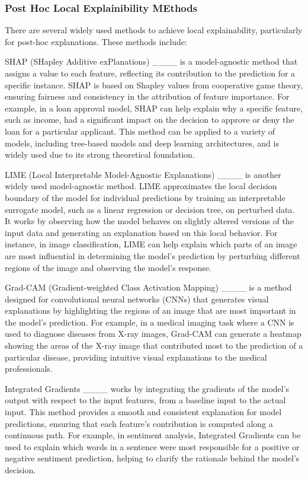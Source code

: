 \subsubsection{Post Hoc Local Explainibility MEthods}
There are several widely used methods to achieve local explainability, particularly for post-hoc explanations. These methods include:

SHAP (SHapley Additive exPlanations) ____ is a model-agnostic method that assigns a value to each feature, reflecting its contribution to the prediction for a specific instance. SHAP is based on Shapley values from cooperative game theory, ensuring fairness and consistency in the attribution of feature importance. For example, in a loan approval model, SHAP can help explain why a specific feature, such as income, had a significant impact on the decision to approve or deny the loan for a particular applicant. This method can be applied to a variety of models, including tree-based models and deep learning architectures, and is widely used due to its strong theoretical foundation.

LIME (Local Interpretable Model-Agnostic Explanations) ____ is another widely used model-agnostic method. LIME approximates the local decision boundary of the model for individual predictions by training an interpretable surrogate model, such as a linear regression or decision tree, on perturbed data. It works by observing how the model behaves on slightly altered versions of the input data and generating an explanation based on this local behavior. For instance, in image classification, LIME can help explain which parts of an image are most influential in determining the model's prediction by perturbing different regions of the image and observing the model's response.

Grad-CAM (Gradient-weighted Class Activation Mapping) ____ is a method designed for convolutional neural networks (CNNs) that generates visual explanations by highlighting the regions of an image that are most important in the model's prediction. For example, in a medical imaging task where a CNN is used to diagnose diseases from X-ray images, Grad-CAM can generate a heatmap showing the areas of the X-ray image that contributed most to the prediction of a particular disease, providing intuitive visual explanations to the medical professionals.

Integrated Gradients ____ works by integrating the gradients of the model’s output with respect to the input features, from a baseline input to the actual input. This method provides a smooth and consistent explanation for model predictions, ensuring that each feature’s contribution is computed along a continuous path. For example, in sentiment analysis, Integrated Gradients can be used to explain which words in a sentence were most responsible for a positive or negative sentiment prediction, helping to clarify the rationale behind the model's decision.

